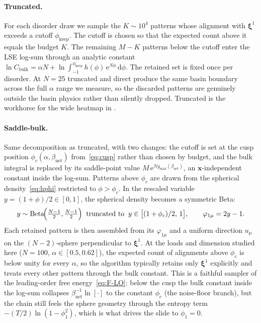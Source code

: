 \documentclass[11pt]{article}
\newcommand{\bxi}{\boldsymbol{\xi}}
\newcommand{\bx}{\bm{x}}
\newcommand{\e}{{\mathrm{e}}}
\newcommand{\dd}{{\mathrm{d}}}
\newcommand{\Bnet}{\beta_{\mathrm{net}}}
\newcommand{\gmax}{g_{\max}}
\begin{document}
\paragraph{Truncated.}
For each disorder draw we sample the $K \sim 10^4$ patterns whose
alignment with $\bxi^1$ exceeds a cutoff $\phi_{\mathrm{keep}}$.  The
cutoff is chosen so that the expected count above it equals the budget
$K$.  The remaining $M - K$ patterns below the cutoff enter the LSE
log-sum through an analytic constant
$\ln C_{\mathrm{bulk}} = \alpha N + \ln \int_{-1}^{\phi_{\mathrm{keep}}}
h(\phi)\,\e^{N\phi}\,\dd\phi$.  The retained set is fixed once
per disorder.  At $N = 25$ truncated and direct produce the same basin
boundary across the full $\alpha$ range we measure, so the discarded
patterns are genuinely outside the basin physics rather than silently
dropped.  Truncated is the workhorse for the wide heatmap in
.

\paragraph{Saddle-bulk.}
Same decomposition as truncated, with two changes: the cutoff is set at
the cusp position $\phi_c(\alpha, \Bnet)$ from~\eqref{eq:cusp} rather
than chosen by budget, and the bulk integral is replaced by its
saddle-point value $M\,\e^{N\gmax(\Bnet)}$, an $\bx$-independent
constant inside the log-sum.  Patterns above $\phi_c$ are drawn from
the spherical density~\eqref{eq:hphi} restricted to $\phi > \phi_c$.
In the rescaled variable $y = (1 + \phi)/2 \in [0, 1]$, the spherical
density becomes a symmetric Beta:
\begin{equation}
y \sim \mathrm{Beta}\!\Bigl(\tfrac{N-1}{2}, \tfrac{N-1}{2}\Bigr)
   \;\;\text{truncated to}\;\; y \in \bigl[(1 + \phi_c)/2,\,1\bigr],
\qquad \varphi_{1\mu} = 2y - 1.
\label{eq:beta-tail}
\end{equation}
Each retained pattern is then assembled from its $\varphi_{1\mu}$ and a
uniform direction $u_\mu$ on the $(N-2)$-sphere perpendicular to
$\bxi^1$.  At the loads and dimension studied here ($N = 100$,
$\alpha \in [0.5, 0.62]$), the expected count of alignments above
$\phi_c$ is below unity for every $\alpha$, so the algorithm
typically retains only $\bxi^1$ explicitly and treats every other
pattern through the bulk constant.  This is a faithful sampler of the
leading-order free energy~\eqref{eq:F-LO}: below the cusp the bulk
constant inside the log-sum collapses $\Bnet^{-1}\ln[\cdot]$ to the
constant $\phi_c$ (the noise-floor branch), but the chain still
feels the sphere geometry through the entropy term $-(T/2)\ln(1 -
\phi_1^2)$, which is what drives the slide to $\phi_1 = 0$.
\end{document}
